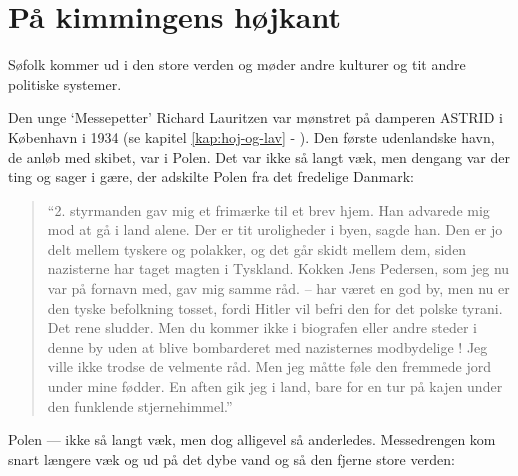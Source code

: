 \chapter{På kimmingens højkant}\label{puxe5-kimmingens-huxf8jkant}

Søfolk kommer ud i den store verden og møder andre kulturer og tit andre
politiske systemer. 

Den unge `Messepetter' Richard Lauritzen var mønstret på damperen ASTRID
i København i 1934 (se kapitel \ref{kap:hoj-og-lav} -
). Den første udenlandske havn, de anløb med
skibet, var  i Polen. Det var ikke
så langt væk, men dengang var der ting og sager i gære, der adskilte
Polen fra det fredelige Danmark: 

\begin{quote}

    ``2. styrmanden gav mig et frimærke til et brev hjem. Han advarede
    mig mod at gå i land alene. Der er tit uroligheder i byen, sagde han.
    Den er jo delt mellem tyskere og polakker, og det går skidt mellem
    dem, siden nazisterne har taget magten i Tyskland. Kokken Jens
    Pedersen, som jeg nu var på fornavn med, gav mig samme råd. --
     har været en god by, men nu er den tyske befolkning
    tosset, fordi Hitler vil befri den for det polske tyrani. Det rene
    sludder. Men du kommer ikke i biografen eller andre steder i denne by
    uden at blive bombarderet med nazisternes modbydelige
    ! Jeg ville ikke
    trodse de velmente råd. Men jeg måtte føle den fremmede jord under
    mine fødder. En aften gik jeg i land, bare for en tur på kajen under
    den funklende stjernehimmel.''
    
\end{quote}

Polen --- ikke så langt væk, men dog alligevel så anderledes.
Messedrengen kom snart længere væk og ud på det dybe vand og så den
fjerne store verden: 

